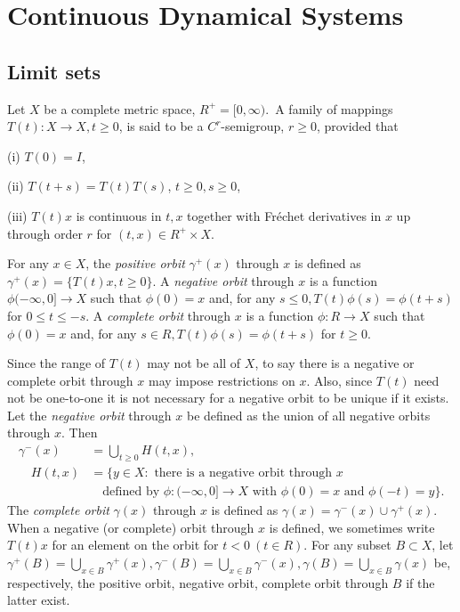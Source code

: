 \documentclass{surv-l}
\theoremstyle{plain}
\theoremstyle{definition}
\numberwithin{equation}{section}
\numberwithin{figure}{chapter}
\begin{document}
\chapter{Continuous Dynamical Systems}\label{chap03}

\section{Limit sets}\label{sec3.1}

Let $X$ be a complete metric space, $R^{+}=[0, \infty)$.\, A family of mappings $T(t)\!:X\rightarrow X, t\geq 0$, is said to be a $C^{r}$-semigroup, $r\geq 0$, provided that

(i) $T(0)=I$,

(ii) $T(t+s)=T(t)T(s)$, $t\geq 0, s\geq 0$,

(iii) $T(t)x$ is continuous in $t, x$ together with Fr\'{e}chet derivatives in $x$ up through order $r$ for $(t, x)\in R^{+}\times X$.

For any $x\in X$, the \emph{positive orbit} $\gamma^{+}(x)$ through $x$ is defined as $\gamma^{+}(x)= \{T(t)x, t\geq 0\}$. A \emph{negative orbit} through $x$ is a function $\phi(-\infty, 0]\rightarrow X$ such that $\phi(0)=x$ and, for any $s\leq 0, T(t)\phi(s)=\phi(t+s)$ for $0\leq t\leq-s$. A \emph{complete orbit} through $x$ is a function $\phi\!:R\rightarrow X$ such that $\phi(0)=x$ and, for any $s\in R, T(t)\phi(s)=\phi(t+s)$ for $t\geq 0$.

Since the range of $T(t)$ may not be all of $X$, to say there is a negative or complete orbit through $x$ may impose restrictions on $x$. Also, since $T(t)$ need not be one-to-one it is not necessary for a negative orbit to be unique if it exists. Let the \emph{negative orbit} through $x$ be defined as the union of all negative orbits through $x$. Then
\begin{align*}
\gamma^{-}(x)&=\bigcup_{t\geq 0}H(t, x),\\
\quad H(t, x)&=\{y\in X\!: \text{ there is a negative orbit through } x\\
&\quad\text{defined by } \phi\!:(-\infty, 0]\rightarrow X \text{ with } \phi(0)=x    \text{ and } \phi(-t)=y\}.
\end{align*}
The \emph{complete orbit} $\gamma(x)$ through $x$ is defined as $\gamma(x)=\gamma^{-}(x)\cup\gamma^{+}(x)$. When a negative (or complete) orbit through $x$ is defined, we sometimes write $T(t)x$ for an element on the orbit for $t<0\ (t\in R)$. For any subset $B\subset X$, let $\gamma^{+}(B)=\bigcup_{x\in B}\gamma^{+}(x), \gamma^{-}(B)=\bigcup_{x\in B}\gamma^{-}(x),\gamma(B)=\bigcup_{x\in B}\gamma(x)$ be, respectively, the positive orbit, negative orbit, complete orbit through $B$ if the latter exist.
\end{document}
